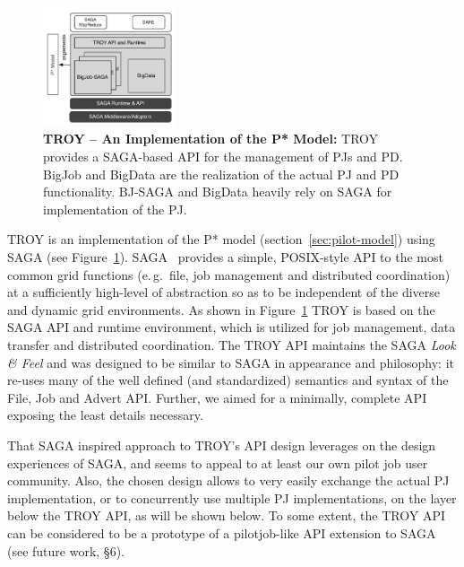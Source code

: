\documentclass[conference,final]{IEEEtran}
\newcommand{\jhanote}[1]{ {\textcolor{red} { ***shantenu: #1 }}}
\newcommand{\alnote}[1]{ {\textcolor{blue} { ***andre: #1 }}}
\newcommand{\alnote}[1]{}
\newcommand{\jhanote}[1]{}
\newcommand{\upp}{\vspace*{-0.5em}}
\begin{document}

\begin{figure}[t]
	\centering
		\includegraphics[width=0.35\textwidth]{figures/pstar_troy.pdf}
	\caption{\textbf{TROY -- An Implementation of the P* Model:}  TROY provides 
	a SAGA-based API for the management of PJs and PD. BigJob and BigData are 
	the realization of the actual PJ and PD functionality. BJ-SAGA and BigData 
	heavily rely on SAGA for implementation of the PJ.\upp
	}
	\label{fig:figures_pstar_troy}
\end{figure}

TROY is an implementation of the P* model
(section~\ref{sec:pilot-model}) using SAGA (see
Figure~\ref{fig:figures_pstar_troy}). SAGA~\cite{saga_url,saga_gfd90}
provides a simple, POSIX-style API to the most common grid functions
(e.\,g.\ file, job management and distributed coordination) at a
sufficiently high-level of abstraction so as to be independent of the
diverse and dynamic grid environments. As shown in
Figure~\ref{fig:figures_pstar_troy} TROY is based on %
the SAGA API and runtime environment, which is utilized for job
management, data transfer and distributed coordination. The TROY API
maintains the SAGA {\it Look \& Feel} and was designed to be similar
to SAGA in appearance 
and philosophy: it re-uses many of the well defined (and standardized)
semantics and syntax of the File, Job and Advert API. Further, we
aimed for a minimally, complete API exposing the least details
necessary.  

That SAGA inspired approach to TROY's API design leverages on the
design experiences of SAGA, and seems to appeal to at least our own
pilot job user community.  Also, the chosen design allows to very
easily exchange the actual PJ implementation, or to concurrently use
multiple PJ implementations, on the layer below the TROY API, as will
be shown below.  To some extent, the TROY API can be considered to be
a prototype of a pilotjob-like API extension to SAGA (see future work,
\S6).
\end{document}
